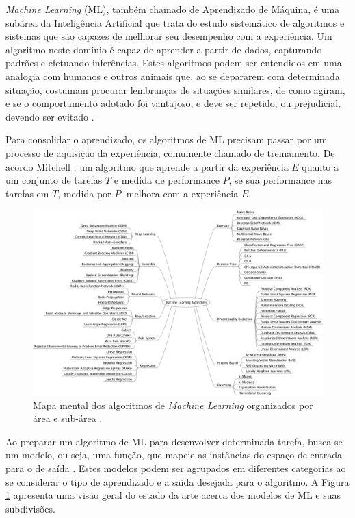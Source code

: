 
\emph{Machine Learning} (ML), também chamado de Aprendizado de Máquina, é uma subárea da Inteligência Artificial que trata do estudo sistemático de algoritmos e sistemas que são capazes de melhorar seu desempenho com a experiência. Um algoritmo neste domínio é capaz de aprender a partir de dados, capturando padrões e efetuando inferências. Estes algoritmos podem ser entendidos em uma analogia com  humanos e outros animais que, ao se depararem com determinada situação, costumam procurar lembranças de situações similares, de como agiram, e se o comportamento adotado foi vantajoso, e deve ser repetido, ou prejudicial, devendo ser evitado \cite{marsland2015machine,goodfellow2016deep,flach2012machine}.

Para consolidar o aprendizado, os algoritmos de ML precisam passar por um processo de aquisição da experiência, comumente chamado de treinamento. De acordo Mitchell \cite{mitchell1997machine}, um algoritmo que aprende a partir da experiência $E$ quanto a um conjunto de tarefas $T$ e medida de performance $P$, se sua performance nas tarefas em $T$, medida por $P$, melhora com a experiência $E$.

\begin{figure}
	\includegraphics[width=\linewidth]{img/machinelearningalgorithms.png}
	\caption{Mapa mental dos algoritmos de \emph{Machine Learning} organizados por área e sub-área \cite{ml:algos}.}
	\label{fig:ml_algorithms}
\end{figure}

Ao preparar um algoritmo de ML para desenvolver determinada tarefa, busca-se um modelo, ou seja, uma função, que mapeie as instâncias do espaço de entrada para o de saída \cite{flach2012machine}. Estes modelos podem ser agrupados em diferentes categorias ao se considerar o tipo de aprendizado e a saída desejada para o algoritmo. A Figura \ref{fig:ml_algorithms} apresenta uma visão geral do estado da arte acerca dos modelos de ML e suas subdivisões.

